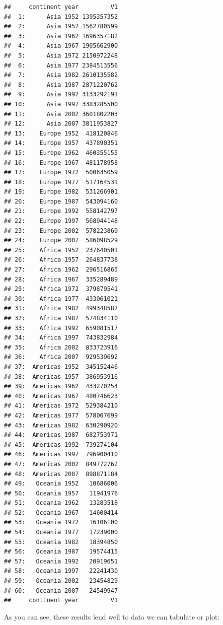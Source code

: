 \documentclass[]{article}
\begin{document}
\begin{verbatim}
##     continent year         V1
##  1:      Asia 1952 1395357352
##  2:      Asia 1957 1562780599
##  3:      Asia 1962 1696357182
##  4:      Asia 1967 1905662900
##  5:      Asia 1972 2150972248
##  6:      Asia 1977 2384513556
##  7:      Asia 1982 2610135582
##  8:      Asia 1987 2871220762
##  9:      Asia 1992 3133292191
## 10:      Asia 1997 3383285500
## 11:      Asia 2002 3601802203
## 12:      Asia 2007 3811953827
## 13:    Europe 1952  418120846
## 14:    Europe 1957  437890351
## 15:    Europe 1962  460355155
## 16:    Europe 1967  481178958
## 17:    Europe 1972  500635059
## 18:    Europe 1977  517164531
## 19:    Europe 1982  531266901
## 20:    Europe 1987  543094160
## 21:    Europe 1992  558142797
## 22:    Europe 1997  568944148
## 23:    Europe 2002  578223869
## 24:    Europe 2007  586098529
## 25:    Africa 1952  237640501
## 26:    Africa 1957  264837738
## 27:    Africa 1962  296516865
## 28:    Africa 1967  335289489
## 29:    Africa 1972  379879541
## 30:    Africa 1977  433061021
## 31:    Africa 1982  499348587
## 32:    Africa 1987  574834110
## 33:    Africa 1992  659081517
## 34:    Africa 1997  743832984
## 35:    Africa 2002  833723916
## 36:    Africa 2007  929539692
## 37:  Americas 1952  345152446
## 38:  Americas 1957  386953916
## 39:  Americas 1962  433270254
## 40:  Americas 1967  480746623
## 41:  Americas 1972  529384210
## 42:  Americas 1977  578067699
## 43:  Americas 1982  630290920
## 44:  Americas 1987  682753971
## 45:  Americas 1992  739274104
## 46:  Americas 1997  796900410
## 47:  Americas 2002  849772762
## 48:  Americas 2007  898871184
## 49:   Oceania 1952   10686006
## 50:   Oceania 1957   11941976
## 51:   Oceania 1962   13283518
## 52:   Oceania 1967   14600414
## 53:   Oceania 1972   16106100
## 54:   Oceania 1977   17239000
## 55:   Oceania 1982   18394850
## 56:   Oceania 1987   19574415
## 57:   Oceania 1992   20919651
## 58:   Oceania 1997   22241430
## 59:   Oceania 2002   23454829
## 60:   Oceania 2007   24549947
##     continent year         V1
\end{verbatim}

As you can see, these results lend well to data we can tabulate or plot:
\end{document}

